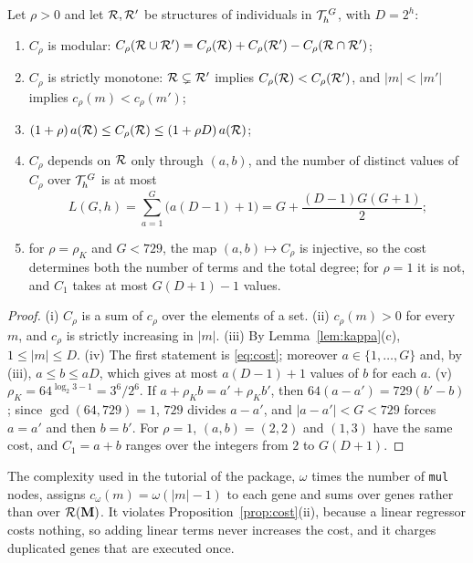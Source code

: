 \begin{proposition}\label{prop:cost}
Let $\rho>0$ and let $\mathcal{R},\mathcal{R}'$ be structures of individuals in $\mathcal{T}_h^{\,G}$, with $D=2^h$:
\begin{enumerate}
\item[(i)] $C_\rho$ is modular: $C_\rho(\mathcal{R}\cup\mathcal{R}')=C_\rho(\mathcal{R})+C_\rho(\mathcal{R}')-C_\rho(\mathcal{R}\cap\mathcal{R}')$;
\item[(ii)] $C_\rho$ is strictly monotone: $\mathcal{R}\subsetneq\mathcal{R}'$ implies $C_\rho(\mathcal{R})<C_\rho(\mathcal{R}')$, and $|m|<|m'|$ implies $c_\rho(m)<c_\rho(m')$;
\item[(iii)] $(1+\rho)\,a(\mathcal{R})\le C_\rho(\mathcal{R})\le(1+\rho D)\,a(\mathcal{R})$;
\item[(iv)] $C_\rho$ depends on $\mathcal{R}$ only through $(a,b)$, and the number of distinct values of $C_\rho$ over $\mathcal{T}_h^{\,G}$
is at most
\begin{equation}
L(G,h)=\sum_{a=1}^{G}\big(a(D-1)+1\big)=G+\frac{(D-1)G(G+1)}{2};
\label{eq:levels}
\end{equation}
\item[(v)] for $\rho=\rho_K$ and $G<729$, the map $(a,b)\mapsto C_{\rho}$ is injective, so the cost determines both the
number of terms and the total degree; for $\rho=1$ it is not, and $C_1$ takes at most $G(D+1)-1$ values.
\end{enumerate}
\end{proposition}
\begin{proof}
(i) $C_\rho$ is a sum of $c_\rho$ over the elements of a set. (ii) $c_\rho(m)>0$ for every $m$, and $c_\rho$ is strictly
increasing in $|m|$. (iii) By Lemma~\ref{lem:kappa}(c), $1\le|m|\le D$. (iv) The first statement is
\eqref{eq:cost}; moreover $a\in\{1,\dots,G\}$ and, by (iii), $a\le b\le aD$, which gives at most $a(D-1)+1$ values of $b$
for each $a$. (v) $\rho_K=64^{\log_2 3-1}=3^6/2^6$. If $a+\rho_K b=a'+\rho_K b'$, then $64(a-a')=729(b'-b)$; since
$\gcd(64,729)=1$, $729$ divides $a-a'$, and $|a-a'|<G<729$ forces $a=a'$ and then $b=b'$. For $\rho=1$,
$(a,b)=(2,2)$ and $(1,3)$ have the same cost, and $C_1=a+b$ ranges over the integers from $2$ to $G(D+1)$.
\end{proof}

\begin{remark}
The complexity used in the tutorial of the package, $\omega$ times the number of \texttt{mul} nodes, assigns
$c_\omega(m)=\omega(|m|-1)$ to each gene and sums over genes rather than over $\mathcal{R}(\mathbf{M})$. It violates
Proposition~\ref{prop:cost}(ii), because a linear regressor costs nothing, so adding linear terms never increases the
cost, and it charges duplicated genes that are executed once.
\end{remark}

